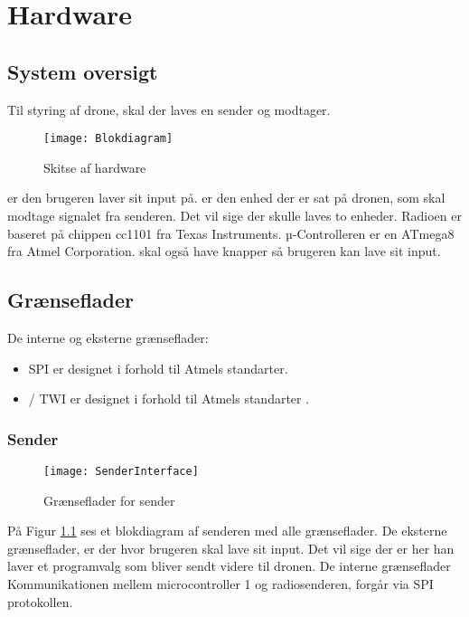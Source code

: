 \documentclass[Main]{subfiles}
\begin{document}
\chapter{Hardware}

\section{System oversigt}

Til styring af drone, skal der laves en sender og modtager.

\begin{figure}[H]
\centering
\texttt{[image: Blokdiagram]}
\caption{Skitse af hardware}
\end{figure}

 er den brugeren laver sit input på. 
 er den enhed der er sat på dronen, som skal modtage signalet fra senderen.
Det vil sige der skulle laves to enheder. 
Radioen er baseret på chippen cc1101\cite{cc1101} fra Texas Instruments. 
µ-Controlleren er en ATmega8 fra Atmel Corporation.
 skal også have knapper så brugeren kan lave sit input.

\section{Grænseflader}
De interne og eksterne grænseflader:
\begin{itemize}
\item SPI er designet i forhold til Atmels standarter\cite{SPI}.
\item \itoc / TWI er designet i forhold til Atmels standarter \cite{Twi}.
\end{itemize}



\subsection{Sender}
\begin{figure}[H]
\centering
\texttt{[image: SenderInterface]}
\caption{Grænseflader for sender}
\label{fig: SenderInterface}
\end{figure}
På Figur \ref{fig: SenderInterface} ses et blokdiagram af senderen med alle grænseflader.
De eksterne grænseflader, er der hvor brugeren skal lave sit input. Det vil sige der er her han laver et programvalg som bliver sendt videre til dronen.
De interne grænseflader
Kommunikationen mellem microcontroller 1 og radiosenderen, forgår via SPI protokollen. 
\end{document}
